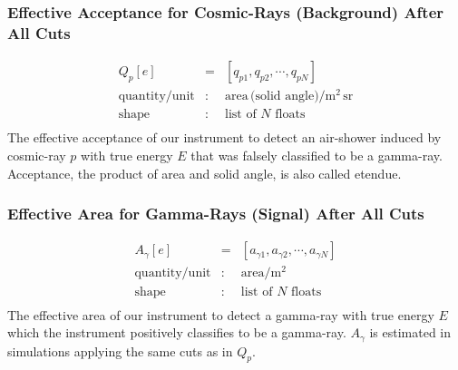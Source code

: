 \documentclass{article}%
\begin{document}
            \subsubsection*{Effective Acceptance for Cosmic-Rays (Background) After All Cuts}
                \begin{eqnarray*}
                    Q_p[e] &=& [q_{p1}, q_{p2}, \cdots, q_{pN}]\\
                    \text{quantity}/\text{unit} &:& \text{area} \, \text{(solid angle)} / \text{m}^{2}\,\text{sr}\\
                    \text{shape} &:& \text{list of}\,\,N\,\,\text{floats}\\
                \end{eqnarray*}
                The effective acceptance of our instrument to detect an air-shower induced by cosmic-ray $p$ with true energy $E$ that was falsely classified to be a gamma-ray.
                Acceptance, the product of area and solid angle, is also called etendue.
            \subsubsection*{Effective Area for Gamma-Rays (Signal) After All Cuts}
                \begin{eqnarray*}
                    A_\gamma[e] &=& [a_{\gamma 1}, a_{\gamma 2}, \cdots, a_{\gamma N}]\\
                    \text{quantity}/\text{unit} &:& \text{area} / \text{m}^{2}\\
                    \text{shape} &:& \text{list of}\,\,N\,\,\text{floats}\\
                \end{eqnarray*}
                The effective area of our instrument to detect a gamma-ray with true energy $E$ which the instrument positively classifies to be a gamma-ray.
                $A_\gamma$ is estimated in simulations applying the same cuts as in $Q_p$.
\end{document}
